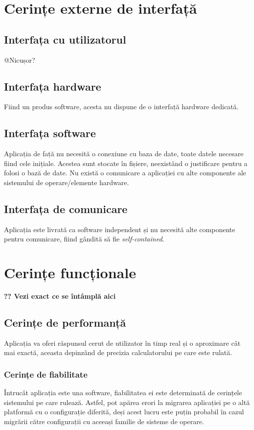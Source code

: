 \documentclass{scrreprt}
\begin{document}
\chapter{Cerințe externe de interfață}

\section{Interfața cu utilizatorul}
@Nicușor?

\section{Interfața hardware}
Fiind un produs software, acesta nu dispune de o interfață hardware dedicată.

\section{Interfața software}
Aplicația de față nu necesită o conexiune cu baza de date, toate datele necesare fiind cele inițiale. Acestea sunt stocate în fișiere, neexistând o justificare pentru a folosi o bază de date. Nu există o comunicare a aplicației cu alte componente ale sistemului de operare/elemente hardware.

\section{Interfața de comunicare}
Aplicația este livrată ca software independent și nu necesită alte componente pentru comunicare, fiind gândită să fie \textit{self-contained}.

\chapter{Cerințe funcționale}
\textbf{?? Vezi exact ce se întâmplă aici}

\section{Cerințe de performanță}
Aplicația va oferi răspunsul cerut de utilizator în timp real și o aproximare cât mai exactă, aceasta depinzând de precizia calculatorului pe care este rulată.

\subsection{Cerințe de fiabilitate}
Întrucât aplicația este una software, fiabilitatea ei este determinată de cerințele sistemului pe care rulează. Astfel, pot apărea erori la migrarea aplicației pe o altă platformă cu o configurație diferită, deși acest lucru este puțin probabil în cazul migrării către configurații cu aceeași familie de sisteme de operare.
\end{document}
